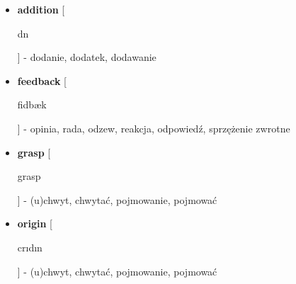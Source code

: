 \documentclass[a4paper,11pt]{article}
\begin{document}
\begin{itemize}

\item \textbf{addition}
[\begin{IPA}
\textschwa \textprimstress d\textsci\textesh\textschwa n
\end{IPA}] - dodanie, dodatek, dodawanie
\item \textbf{feedback}
[\begin{IPA}
\textprimstress fi\textlengthmark db\ae k
\end{IPA}] - opinia, rada, odzew, reakcja, odpowiedź, sprzężenie zwrotne
\item \textbf{grasp}
[\begin{IPA}
gra\textlengthmark sp
\end{IPA}] - (u)chwyt, chwytać, pojmowanie, pojmować
\item \textbf{origin}
[\begin{IPA}
\textprimstress cr\i d\textyogh\i n
\end{IPA}] - (u)chwyt, chwytać, pojmowanie, pojmować



\end{itemize} 
\end{document}
